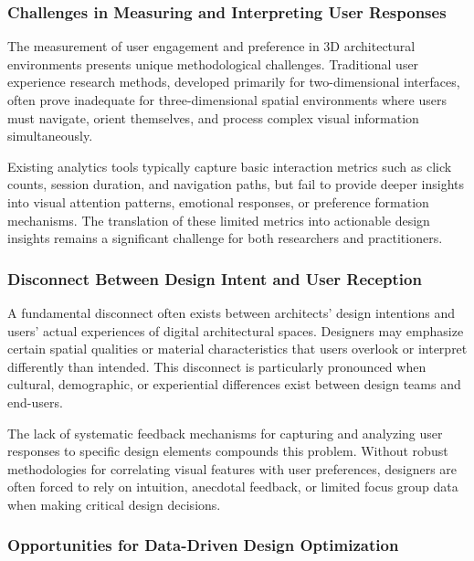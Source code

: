 \documentclass[12pt,a4paper]{book}
\begin{document}
\subsubsection{Challenges in Measuring and Interpreting User Responses}
\label{subsubsec:measuring_user_responses}

The measurement of user engagement and preference in 3D architectural environments presents unique methodological challenges. Traditional user experience research methods, developed primarily for two-dimensional interfaces, often prove inadequate for three-dimensional spatial environments where users must navigate, orient themselves, and process complex visual information simultaneously.

Existing analytics tools typically capture basic interaction metrics such as click counts, session duration, and navigation paths, but fail to provide deeper insights into visual attention patterns, emotional responses, or preference formation mechanisms. The translation of these limited metrics into actionable design insights remains a significant challenge for both researchers and practitioners.

\subsubsection{Disconnect Between Design Intent and User Reception}
\label{subsubsec:design_intent_disconnect}

A fundamental disconnect often exists between architects' design intentions and users' actual experiences of digital architectural spaces. Designers may emphasize certain spatial qualities or material characteristics that users overlook or interpret differently than intended. This disconnect is particularly pronounced when cultural, demographic, or experiential differences exist between design teams and end-users.

The lack of systematic feedback mechanisms for capturing and analyzing user responses to specific design elements compounds this problem. Without robust methodologies for correlating visual features with user preferences, designers are often forced to rely on intuition, anecdotal feedback, or limited focus group data when making critical design decisions.

\subsubsection{Opportunities for Data-Driven Design Optimization}
\label{subsubsec:data_driven_opportunities}
\end{document}
